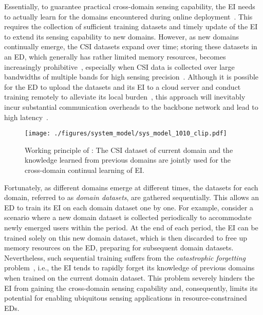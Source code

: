 Essentially, to guarantee practical cross-domain sensing capability, the EI needs to actually learn for the domains encountered during online deployment~\cite{Gulrajani21ICLR_In}.
This requires the collection of sufficient training datasets and timely update of the EI to extend its sensing capability to new domains. 
However, as new domains continually emerge, the CSI datasets expand over time; storing these datasets in an ED, which generally has rather limited memory resources, becomes increasingly prohibitive~\cite{Mao17CST_Survey,Haibeh22Access_Survey}, especially when CSI data is collected over large bandwidths of multiple bands for high sensing precision~\cite{Li24MobiSys_UWB}.
Although it is possible for the ED to upload the datasets and its EI to a cloud server and conduct training remotely to alleviate its local burden~\cite{Lin19PIEEE_Computation}, this approach will inevitably incur substantial communication overheads to the backbone network and lead to high latency~\cite{Barbera13INFOCOM_Offload}.


\begin{figure}[t] 
    \centering
    \texttt{[image: ./figures/system\_model/sys\_model\_1010\_clip.pdf]}
        \caption{Working principle of \name: The CSI dataset of current domain and the knowledge learned from previous domains are jointly used for the cross-domain continual learning of EI.}
        \label{fig_sys_mod}
    \vspace{-.5em}
    \end{figure}

Fortunately, as different domains emerge at different times, the datasets for each domain, referred to as \emph{domain datasets}, are gathered sequentially. 
This allows an ED to train its EI on each domain dataset one by one.
For example, consider a scenario where a new domain dataset is collected periodically to accommodate newly emerged users within the period.
At the end of each period, the EI can be trained solely on this new domain dataset, which is then discarded to free up memory resources on the ED, preparing for subsequent domain datasets.
Nevertheless, such sequential training suffers from the \emph{catastrophic forgetting} problem~\cite{Goodfellow14ICLR_Empirical,Kemker18AAAI_Measuring}, i.e., the EI tends to rapidly forget its knowledge of previous domains when trained on the current domain dataset.
This problem severely hinders the EI from gaining the cross-domain sensing capability and, consequently, limits its potential for enabling ubiquitous sensing applications in resource-constrained EDs.


